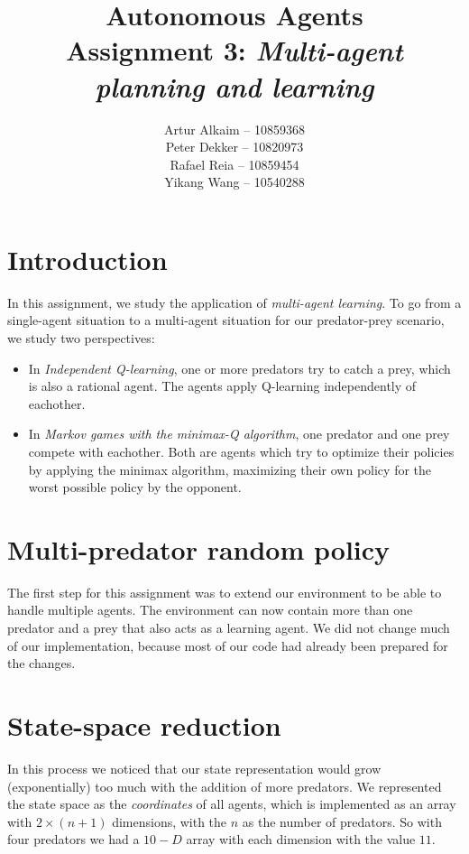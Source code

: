 \documentclass{article}
\begin{document}
\title{Autonomous Agents\\
Assignment 3: \emph{Multi-agent planning and learning}}
\author{
Artur Alkaim -- 10859368\\
Peter Dekker -- 10820973\\
Rafael Reia -- 10859454\\
Yikang Wang -- 10540288\\
}
\maketitle
\section{Introduction}
In this assignment, we study the application of \emph{multi-agent learning}. To go from a single-agent situation to a multi-agent situation for our predator-prey scenario, we study two perspectives:

\begin{itemize}
 \item In \emph{Independent Q-learning}, one or more predators try to catch a prey, which is also a rational agent. The agents apply Q-learning independently of eachother.
 \item In \emph{Markov games with the minimax-Q algorithm}, one predator and one prey compete with eachother. Both are agents which try to optimize their policies by applying the minimax algorithm, maximizing their own policy for the worst possible policy by the opponent.
\end{itemize}
\section{Multi-predator random policy}
The first step for this assignment was to extend our environment to be able to
handle multiple agents. The environment can now contain more than one predator and a prey that also acts as a learning agent.
We did not change much of our implementation, because most of our code had
already been prepared for the changes.

\section{State-space reduction}
In this process we noticed that our state representation would grow
(exponentially) too much with the addition of more predators. We represented the
state space as the \emph{coordinates} of all agents, which is implemented as
an array with $2 \times (n+1)$ dimensions, with the $n$ as the number of predators. So with four predators we had a $10-D$ array with each 
dimension with the value $11$. 
\end{document}
